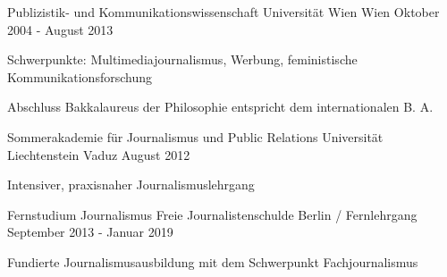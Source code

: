 

\begin{cventries}

  \cventry
    {Publizistik- und Kommunikationswissenschaft} %
    {Universität Wien} %
    {Wien} %
    {Oktober 2004 - August 2013} %
    {
      \begin{cvitems} %
        \item {Schwerpunkte: Multimediajournalismus, Werbung, feministische Kommunikationsforschung}
        \item {Abschluss Bakkalaureus der Philosophie entspricht dem internationalen B. A.}
      \end{cvitems}
    }

    \cventry
    {Sommerakademie für Journalismus und Public Relations} %
    {Universität Liechtenstein} %
    {Vaduz} %
    {August 2012} %
    {
      \begin{cvitems} %
        \item {Intensiver, praxisnaher Journalismuslehrgang}
      \end{cvitems}
    }

    \cventry
    {Fernstudium Journalismus} %
    {Freie Journalistenschulde} %
    {Berlin / Fernlehrgang} %
    {September 2013 - Januar 2019} %
    {
      \begin{cvitems} %
        \item {Fundierte Journalismusausbildung mit dem Schwerpunkt Fachjournalismus}
      \end{cvitems}
    }

  


\end{cventries}
